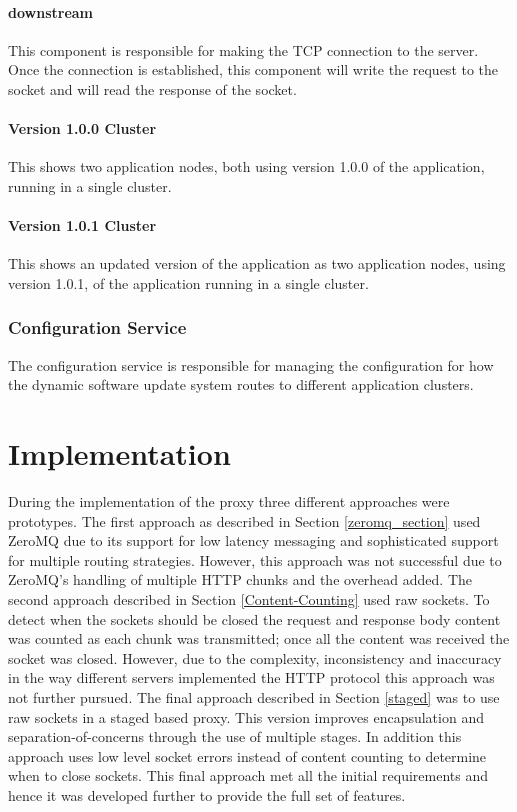 \documentclass[a4paper,11pt,twoside]{report}
\begin{document}
\subsubsection*{downstream}
This component is responsible for making the TCP connection to the server.  Once the connection is established, this component will write the request to the socket and will read the response of the socket.

\subsubsection*{Version 1.0.0 Cluster}
This shows two application nodes, both using version 1.0.0 of the application, running in a single cluster.

\subsubsection*{Version 1.0.1 Cluster}
This shows an updated version of the application as two application nodes, using version 1.0.1, of the application running in a single cluster.

\subsection*{Configuration Service}
The configuration service is responsible for managing the configuration for how the dynamic software update system routes to different application clusters.


\clearpage
\chapter{Implementation} \label{Implementation}
During the implementation of the proxy three different approaches were prototypes.  The first approach as described in Section \ref{zeromq_section} used ZeroMQ due to its support for low latency messaging and sophisticated support for multiple routing strategies.  However, this approach was not successful due to ZeroMQ's handling of multiple HTTP chunks and the overhead added.  The second approach described in Section \ref{Content-Counting} used raw sockets.  To detect when the sockets should be closed the request and response body content was counted as each chunk was transmitted; once all the content was received the socket was closed.  However, due to the complexity, inconsistency and inaccuracy in the way different servers implemented the HTTP protocol this approach was not further pursued.  The final approach described in Section \ref{staged} was to use raw sockets in a staged based proxy.  This version improves encapsulation and separation-of-concerns through the use of multiple stages.  In addition this approach uses low level socket errors instead of content counting to determine when to close sockets.  This final approach met all the initial requirements and hence it was developed further to provide the full set of features.
\end{document}
